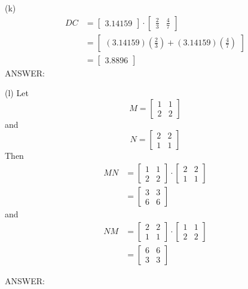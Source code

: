 (k)
\begin{align*}
DC &=
\begin{bmatrix}
3.14159
\end{bmatrix}
\cdot
\begin{bmatrix}
\frac{2}{3} & \frac{4}{7}
\end{bmatrix} \\
&=
\begin{bmatrix}
(3.14159)(\frac{2}{3}) + (3.14159)(\frac{4}{7})
\end{bmatrix} \\
&=
\begin{bmatrix}
3.8896
\end{bmatrix}
\end{align*}
ANSWER: 

(l) 
Let 
\[
M = 
\begin{bmatrix}
1 & 1 \\
2 & 2 
\end{bmatrix}
\]
and
\[
N = 
\begin{bmatrix}
2 & 2 \\
1 & 1 
\end{bmatrix}
\]
Then
\begin{align*}
MN 
&= \begin{bmatrix} 
   1 & 1 \\
   2 & 2 
   \end{bmatrix}
   \cdot
   \begin{bmatrix}
   2 & 2 \\
   1 & 1 
   \end{bmatrix}
\\
&= \begin{bmatrix}
   3 & 3 \\
   6 & 6 
   \end{bmatrix}
\end{align*}
and
\begin{align*}
NM
&= \begin{bmatrix} 
   2 & 2 \\
   1 & 1 
   \end{bmatrix}
   \cdot
   \begin{bmatrix}
   1 & 1 \\
   2 & 2 
   \end{bmatrix}
\\
&= \begin{bmatrix}
   6 & 6 \\
   3 & 3 
   \end{bmatrix}
\end{align*}

ANSWER: 

